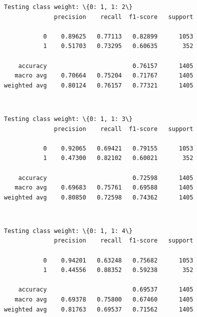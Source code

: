 \documentclass[11pt]{article}
\begin{document}
    \begin{Verbatim}[commandchars=\\\{\}]
Testing class weight: \{0: 1, 1: 2\}
              precision    recall  f1-score   support

           0    0.89625   0.77113   0.82899      1053
           1    0.51703   0.73295   0.60635       352

    accuracy                        0.76157      1405
   macro avg    0.70664   0.75204   0.71767      1405
weighted avg    0.80124   0.76157   0.77321      1405

    \end{Verbatim}

    \begin{center}
    \end{center}
    { \hspace*{\fill} \\}
    
    \begin{Verbatim}[commandchars=\\\{\}]
Testing class weight: \{0: 1, 1: 3\}
              precision    recall  f1-score   support

           0    0.92065   0.69421   0.79155      1053
           1    0.47300   0.82102   0.60021       352

    accuracy                        0.72598      1405
   macro avg    0.69683   0.75761   0.69588      1405
weighted avg    0.80850   0.72598   0.74362      1405

    \end{Verbatim}

    \begin{center}
    \end{center}
    { \hspace*{\fill} \\}
    
    \begin{Verbatim}[commandchars=\\\{\}]
Testing class weight: \{0: 1, 1: 4\}
              precision    recall  f1-score   support

           0    0.94201   0.63248   0.75682      1053
           1    0.44556   0.88352   0.59238       352

    accuracy                        0.69537      1405
   macro avg    0.69378   0.75800   0.67460      1405
weighted avg    0.81763   0.69537   0.71562      1405

    \end{Verbatim}
\end{document}
